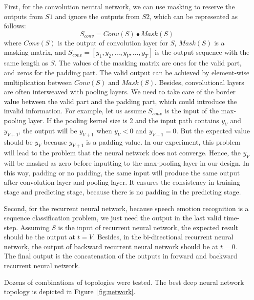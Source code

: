 \documentclass[a4paper]{article}
\begin{document}
First, for the convolution neutral network, we can use masking to reserve the outputs from $S1$ and ignore the outputs from $S2$, which can be represented as follows:
\begin{equation}
\label{eq:masking}
S_{conv}=Conv(S) \bullet Mask(S)
\end{equation}
where $Conv(S)$ is the output of convolution layer for $S$, $Mask(S)$ is a masking matrix, and $S_{conv}=[y_1, y_2, ..., y_V, ..., y_T]$ is the output sequence with the same length as $S$. The values of the masking matrix are ones for the valid part, and zeros for the padding part. The valid output can be achieved by element-wise multiplication between $Conv(S)$ and $Mask(S)$. Besides, convolutional layers are often interweaved with pooling layers. We need to take care of the border value between the valid part and the padding part, which could introduce the invalid information. For example, let us assume $S_{conv}$ is the input of the max-pooling layer. If the pooling kernel size is 2 and the input path contains $y_V$ and $y_{V+1}$, the output will be $y_{V+1}$ when $y_V<0$ and $y_{V+1}=0$. But the expected value should be $y_V$ because $y_{V+1}$ is a padding value. In our experiment, this problem will lead to the problem that the neural network does not converge. Hence, the $y_V$ will be masked as zero before inputting to the max-pooling layer in our design. In this way, padding or no padding, the same input will produce the same output after convolution layer and pooling layer. It ensures the consistency in training stage and predicting stage, because there is no padding in the predicting stage.

Second, for the recurrent neural network, because speech emotion recognition is a sequence classification problem, we just need the output in the last valid time-step. Assuming $S$ is the input of recurrent neural network, the expected result should be the output at $t=V$. Besides, in the bi-directional recurrent neural network, the output of backward recurrent neural network should be at $t=0$. The final output is the concatenation of the outputs in forward and backward recurrent neural network.

Dozens of combinations of topologies were tested. The best deep neural network topology is depicted in Figure~\ref{fig:network}.
\end{document}
